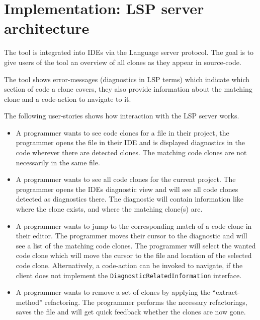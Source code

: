 
\chapter{Implementation: LSP server architecture}

The tool is integrated into IDEs via the Language server protocol. The goal is to give
users of the tool an overview of all clones as they appear in source-code.

The tool shows error-messages (diagnostics in LSP terms) which indicate which section of
code a clone covers, they also provide information about the matching clone and a
code-action to navigate to it.

The following user-stories shows how interaction with the LSP server works.

\begin{itemize}
	\item A programmer wants to see code clones for a file in their project, the
	      programmer opens the file in their IDE and is displayed diagnostics in the code
	      wherever there are detected clones. The matching code clones are not necessarily
	      in the same file.

	\item A programmer wants to see all code clones for the current project. The
	      programmer opens the IDEs diagnostic view and will see all code clones detected
	      as diagnostics there. The diagnostic will contain information like where the clone
	      exists, and where the matching clone(s) are.

	\item A programmer wants to jump to the corresponding match of a code clone in their
	      editor. The programmer moves their cursor to the diagnostic and will see a list of
	      the matching code clones. The programmer will select the wanted code clone which
	      will move the cursor to the file and location of the selected code clone.
          Alternatively, a code-action can be invoked to navigate, if the client does not
          implement the \verb|DiagnosticRelatedInformation| interface.

      \item A programmer wants to remove a set of clones by applying the
          ``extract-method'' refactoring. The programmer performs the necessary
          refactorings, saves the file and will get quick feedback whether the
          clones are now gone.
\end{itemize}

